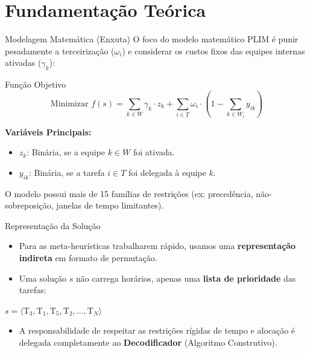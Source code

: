 \documentclass{beamer}
\begin{document}
\section{Fundamentação Teórica}

\begin{frame}{Modelagem Matemática (Enxuta)}
    O foco do modelo matemático PLIM é punir pesadamente a terceirização ($\omega_i$) e considerar os custos fixos das equipes internas ativadas ($\gamma_k$):
    \vspace{0.3cm}
    \begin{block}{Função Objetivo}
        \[
        \text{Minimizar } f(s) = \sum_{k \in W} \gamma_k \cdot z_k + \sum_{i \in T} \omega_i \cdot \left( 1 - \sum_{k \in W_i} y_{ik} \right)
        \]
    \end{block}
    \vspace{0.1cm}
    \textbf{Variáveis Principais:}
    \begin{itemize}
        \item $z_k$: Binária, se a equipe $k \in W$ foi ativada.
        \item $y_{ik}$: Binária, se a tarefa $i \in T$ foi delegada à equipe $k$.
    \end{itemize}
    \vspace{0.1cm}
    O modelo possui mais de 15 famílias de restrições (ex: precedência, não-sobreposição, janelas de tempo limitantes).
\end{frame}

\begin{frame}{Representação da Solução}
    \begin{itemize}
        \item Para as meta-heurísticas trabalharem rápido, usamos uma \textbf{representação indireta} em formato de permutação.
        \item Uma solução $s$ não carrega horários, apenas uma \textbf{lista de prioridade} das tarefas:
    \end{itemize}
    \vspace{0.2cm}
    \begin{center}
        \LARGE
        $s = \langle \text{T}_3, \text{T}_1, \text{T}_5, \text{T}_2, \dots, \text{T}_N \rangle$
    \end{center}
    \vspace{0.2cm}
    \begin{itemize}
        \item A responsabilidade de respeitar as restrições rígidas de tempo e alocação é delegada completamente ao \textbf{Decodificador} (Algoritmo Construtivo).
    \end{itemize}
\end{frame}
\end{document}
